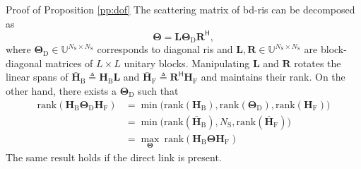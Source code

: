 \documentclass[journal]{IEEEtran}
\begin{document}
\begin{appendix}
	\begin{subsection}{Proof of Proposition \ref{pp:dof}}\label{ap:dof}
		The scattering matrix of \gls{bd}-\gls{ris} can be decomposed as
		\begin{equation}
			\mathbf{\Theta} = \mathbf{L} \mathbf{\Theta}_\mathrm{D} \mathbf{R}^\mathsf{H},
		\end{equation}
		where $\mathbf{\Theta}_\mathrm{D} \in \mathbb{U}^{N_\mathrm{S} \times N_\mathrm{S}}$ corresponds to diagonal \gls{ris} and $\mathbf{L}, \mathbf{R} \in \mathbb{U}^{N_\mathrm{S} \times N_\mathrm{S}}$ are block-diagonal matrices of $L \times L$ unitary blocks.
		Manipulating $\mathbf{L}$ and $\mathbf{R}$ rotates the linear spans of $\bar{\mathbf{H}}_\mathrm{B} \triangleq \mathbf{H}_\mathrm{B} \mathbf{L}$ and $\bar{\mathbf{H}}_\mathrm{F} \triangleq \mathbf{R}^\mathsf{H} \mathbf{H}_\mathrm{F}$ and maintains their rank.
		On the other hand, there exists a $\mathbf{\Theta}_\mathrm{D}$ such that
		\begin{equation*}
			\begin{split}
				\mathrm{rank}(\mathbf{H}_\mathrm{B} \mathbf{\Theta}_\mathrm{D} \mathbf{H}_\mathrm{F})
				 & = \min \bigl( \mathrm{rank}(\mathbf{H}_\mathrm{B}), \mathrm{rank}(\mathbf{\Theta}_\mathrm{D}), \mathrm{rank}(\mathbf{H}_\mathrm{F}) \bigr) \\
				 & = \min \bigl( \mathrm{rank}(\bar{\mathbf{H}}_\mathrm{B}), N_\mathrm{S}, \mathrm{rank}(\bar{\mathbf{H}}_\mathrm{F}) \bigr)                  \\
				 & = \max_\mathbf{\Theta} \ \mathrm{rank}(\mathbf{H}_\mathrm{B} \mathbf{\Theta} \mathbf{H}_\mathrm{F})
			\end{split}
		\end{equation*}
		The same result holds if the direct link is present.
	\end{subsection}


\end{appendix}
\end{document}
